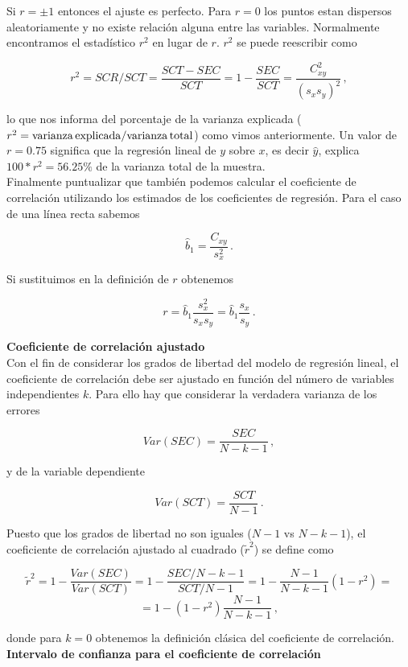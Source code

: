 \documentclass[
]{agujournal2019}
\begin{document}
Si \(r=\pm1\) entonces el ajuste es perfecto. Para \(r=0\) los puntos
estan dispersos aleatoriamente y no existe relación alguna entre las
variables. Normalmente encontramos el estadístico \(r^2\) en lugar de
\(r\). \(r^2\) se puede reescribir como

\[r^2=SCR/SCT=\frac{SCT-SEC}{SCT}=1-\frac{SEC}{SCT}=\frac{C^2_{xy}}{(s_x s_y)^2}\,,\]

lo que nos informa del porcentaje de la varianza explicada
(\(r^2={\rm varianza\,explicada}/{\rm varianza\,total}\)) como vimos
anteriormente. Un valor de \(r=0.75\) significa que la regresión lineal
de \(y\) sobre \(x\), es decir \(\hat{y}\), explica \(100*r^2=56.25\%\)
de la varianza total de la muestra.\\
\noindent Finalmente puntualizar que también podemos calcular el
coeficiente de correlación utilizando los estimados de los coeficientes
de regresión. Para el caso de una línea recta sabemos

\[\hat{b}_1=\frac{C_{xy}}{s^2_x}\,.\]

Si sustituimos en la definición de \(r\) obtenemos

\[r=\hat{b}_1\frac{s^2_x}{s_x s_y}=\hat{b}_1\frac{s_x}{s_y}\,.\]

\textbf{Coeficiente de correlación ajustado}\\

Con el fin de considerar los grados de libertad del modelo de regresión
lineal, el coeficiente de correlación debe ser ajustado en función del
número de variables independientes \(k\). Para ello hay que considerar
la verdadera varianza de los errores

\[Var(SEC)=\frac{SEC}{N-k-1}\,,\]

y de la variable dependiente

\[Var(SCT)=\frac{SCT}{N-1}\,.\]

Puesto que los grados de libertad no son iguales (\(N-1\) vs \(N-k-1\)),
el coeficiente de correlación ajustado al cuadrado (\(\tilde{r}^2\)) se
define como

\[\tilde{r}^2=1-\frac{Var(SEC)}{Var(SCT)}=1-\frac{SEC/N-k-1}{SCT/N-1}=
1-\frac{N-1}{N-k-1}(1-r^2)=\] \[=1-(1-r^2)\frac{N-1}{N-k-1}\,,\]

donde para \(k=0\) obtenemos la definición clásica del coeficiente de
correlación.\\

\textbf{Intervalo de confianza para el coeficiente de correlación}\\
\end{document}
